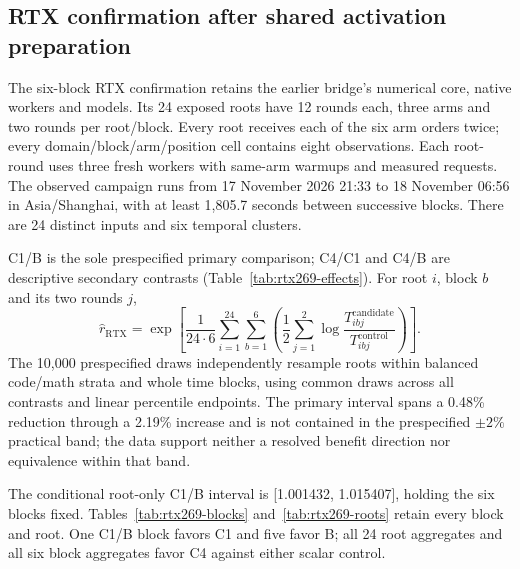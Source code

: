 \subsection{RTX confirmation after shared activation preparation}
\label{supp:rtx-confirmation}

The six-block RTX confirmation retains the earlier bridge's numerical core, native workers and models. Its 24 exposed roots have 12 rounds each, three arms and two rounds per root/block. Every root receives each of the six arm orders twice; every domain/block/arm/position cell contains eight observations. Each root-round uses three fresh workers with same-arm warmups and measured requests. The observed campaign runs from 17 November 2026 21:33 to 18 November 06:56 in \mbox{Asia/Shanghai}, with at least 1,805.7 seconds between successive blocks. There are 24 distinct inputs and six temporal clusters.

C1/B is the sole prespecified primary comparison; C4/C1 and C4/B are descriptive secondary contrasts (Table~\ref{tab:rtx269-effects}). For root $i$, block $b$ and its two rounds $j$,
\begin{equation}
 \widehat r_{\mathrm{RTX}}=\exp\!\left[\frac{1}{24\cdot6}\sum_{i=1}^{24}\sum_{b=1}^{6}\left(\frac12\sum_{j=1}^{2}\log\frac{T^{\mathrm{candidate}}_{ibj}}{T^{\mathrm{control}}_{ibj}}\right)\right].
 \label{eq:rtx-estimator}
\end{equation}
The 10,000 prespecified draws independently resample roots within balanced code/math strata and whole time blocks, using common draws across all contrasts and linear percentile endpoints. The primary interval spans a 0.48\% reduction through a 2.19\% increase and is not contained in the prespecified $\pm2\%$ practical band; the data support neither a resolved benefit direction nor equivalence within that band.


The conditional root-only C1/B interval is [1.001432, 1.015407], holding the six blocks fixed. Tables~\ref{tab:rtx269-blocks} and~\ref{tab:rtx269-roots} retain every block and root. One C1/B block favors C1 and five favor B; all 24 root aggregates and all six block aggregates favor C4 against either scalar control.


